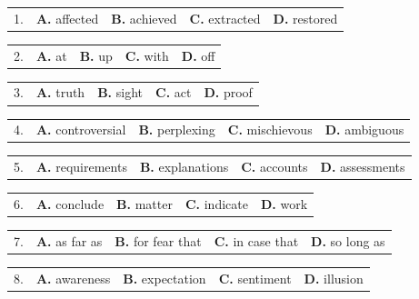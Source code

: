 \documentclass[UTF8,11pt]{ctexart}
\begin{document}
\noindent\begin{tabularx}{\linewidth}{@{}lXXXX@{}}1. & \textbf{A.} affected & \textbf{B.} achieved & \textbf{C.} extracted & \textbf{D.} restored\\\end{tabularx}\par

\noindent\begin{tabularx}{\linewidth}{@{}lXXXX@{}}2. & \textbf{A.} at & \textbf{B.} up & \textbf{C.} with & \textbf{D.} off\\\end{tabularx}\par

\noindent\begin{tabularx}{\linewidth}{@{}lXXXX@{}}3. & \textbf{A.} truth & \textbf{B.} sight & \textbf{C.} act & \textbf{D.} proof\\\end{tabularx}\par

\noindent\begin{tabularx}{\linewidth}{@{}lXXXX@{}}4. & \textbf{A.} controversial & \textbf{B.} perplexing & \textbf{C.} mischievous & \textbf{D.} ambiguous\\\end{tabularx}\par

\noindent\begin{tabularx}{\linewidth}{@{}lXXXX@{}}5. & \textbf{A.} requirements & \textbf{B.} explanations & \textbf{C.} accounts & \textbf{D.} assessments\\\end{tabularx}\par

\noindent\begin{tabularx}{\linewidth}{@{}lXXXX@{}}6. & \textbf{A.} conclude & \textbf{B.} matter & \textbf{C.} indicate & \textbf{D.} work\\\end{tabularx}\par

\noindent\begin{tabularx}{\linewidth}{@{}lXXXX@{}}7. & \textbf{A.} as far as & \textbf{B.} for fear that & \textbf{C.} in case that & \textbf{D.} so long as\\\end{tabularx}\par

\noindent\begin{tabularx}{\linewidth}{@{}lXXXX@{}}8. & \textbf{A.} awareness & \textbf{B.} expectation & \textbf{C.} sentiment & \textbf{D.} illusion\\\end{tabularx}\par
\end{document}
